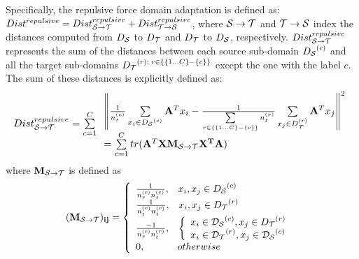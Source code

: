 \documentclass[10pt,twocolumn,letterpaper]{article}
\begin{document}
\begin{CJK*}{UTF8}{gkai}
Specifically, the repulsive force domain adaptation is defined as: 
$Dis{t^{repulsive}} = Dist_{{\cal S} \to {\cal T}}^{repulsive} + Dist_{{\cal T} \to {\cal S}}^{repulsive}$, where ${{\cal S} \to {\cal T}}$ and ${{\cal T} \to {\cal S}}$ index the distances computed from ${D_{\cal S}}$ to ${D_{\cal T}}$ and ${D_{\cal T}}$ to ${D_{\cal S}}$, respectively. $Dist_{{\cal S} \to {\cal T}}^{repulsive}$ represents the sum of the distances between each source sub-domain ${D_{\cal S}}^{(c)}$ and all the  target sub-domains ${D_{\cal T}}^{(r);\;r \in \{ \{ 1...C\}  - \{ c\} \} }$ except the one with the label $c$. The sum of these distances is explicitly defined as:
	\begin{equation}\label{eq:StoT}
		\resizebox{1\hsize}{!}{%
			${Dist}_{{\cal S} \to {\cal T}}^{repulsive} = \sum\limits_{c = 1}^C \begin{array}{l}
			{\left\| {\frac{1}{{n_s^{(c)}}}\sum\limits_{{x_i} \in {D_{\cal S}}^{(c)}} {{{\bf{A}}^T}{x_i}}  - \frac{1}{{\sum\limits_{r \in \{ \{ 1...C\}  - \{ c\} \} } {n_t^{(r)}} }}\sum\limits_{{x_j} \in D_{\cal T}^{(r)}} {{{\bf{A}}^T}{x_j}} } \right\|^2}\\
			= \sum\limits_{c = 1}^C {tr({{\bf{A}}^T}{\bf{X}}{{\bf{M}}_{{\cal S} \to {\cal T}}}{{\bf{X}}^{\bf{T}}}{\bf{A}})} 
			\end{array} $}
	\end{equation}
		where ${{\bf{M}}_{{\cal S} \to {\cal T}}}$ is defined as
			\begin{equation}\label{eq:mstot}
			\begin{array}{c}
				(\bf M_{{{\cal S} \to {\cal T}}})_{ij} = \left\{ {\begin{array}{*{20}{l}}
						{\frac{1}{{n_s^{(c)}n_s^{(c)}}},\;\;\;{x_i},{x_j} \in {D_{\cal S}}^{(c)}}\\
						{\frac{1}{{n_t^{(r)}n_t^{(r)}}},\;\;\;{x_i},{x_j} \in {D_{\cal T}}^{(r)}}\\
						{\frac{{ - 1}}{{n_s^{(c)}n_t^{(r)}}},\;\;\;\left\{ {\begin{array}{*{20}{l}}
									{{x_i} \in {\cal D_{\cal S}}^{(c)},{x_j} \in {D_{\cal T}}^{(r)}}\\
									{{x_i} \in {\cal D_{\cal T}}^{(r)},{x_j} \in {\cal D_{\cal S}}^{(c)}}
								\end{array}} \right.}\\
							{0,\;\;\;\;\;\;\;\;\;\;\;\;otherwise}
						\end{array}} \right.
					\end{array}
				\end{equation}

\end{CJK*}
\end{document}

